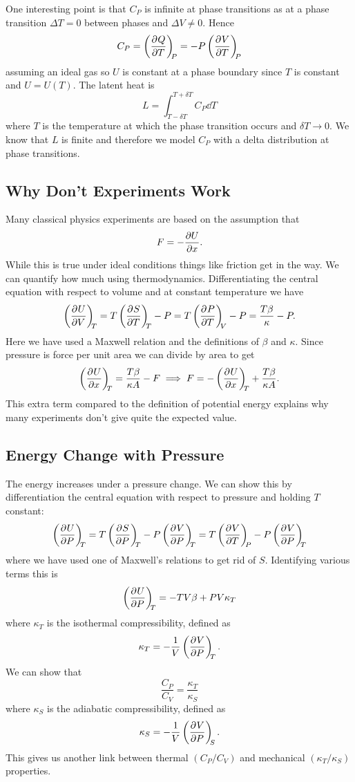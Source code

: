     One interesting point is that \(C_P\) is infinite at phase transitions as at a phase transition \(\Delta T = 0\) between phases and \(\Delta V \ne 0\).
    Hence
    \[C_P = \left(\pdv[]{Q}{T}\right)_{\!\!{P}} = -P\left(\pdv[]{V}{T}\right)_{\!\!{P}}\]
    assuming an ideal gas so \(U\) is constant at a phase boundary since \(T\) is constant and \(U = U(T)\).
    The latent heat is
    \[L = \int_{T - \delta T}^{T + \delta T}C_P\dd{T}\]
    where \(T\) is the temperature at which the phase transition occurs and \(\delta T \to 0\).
    We know that \(L\) is finite and therefore we model \(C_P\) with a delta distribution at phase transitions.
    
    \subsection{Why Don't Experiments Work}
    Many classical physics experiments are based on the assumption that
    \[F = -\pdv{U}{x}.\]
    While this is true under ideal conditions things like friction get in the way.
    We can quantify how much using thermodynamics.
    Differentiating the central equation with respect to volume and at constant temperature we have
    \[\left(\pdv[]{U}{V}\right)_{\!\!{T}} = T\left(\pdv[]{S}{T}\right)_{\!\!{T}} - P = T\left(\pdv[]{P}{T}\right)_{\!\!{V}} - P = \frac{T\beta}{\kappa} - P.\]
    Here we have used a Maxwell relation and the definitions of \(\beta\) and \(\kappa\).
    Since pressure is force per unit area we can divide by area to get
    \[\left(\pdv[]{U}{x}\right)_{\!\!{T}} = \frac{T\beta}{\kappa A} -F \implies F = -\left(\pdv[]{U}{x}\right)_{\!\!{T}} + \frac{T\beta}{\kappa A}.\]
    This extra term compared to the definition of potential energy explains why many experiments don't give quite the expected value.
    
    \subsection{Energy Change with Pressure}
    The energy increases under a pressure change.
    We can show this by differentiation the central equation with respect to pressure and holding \(T\) constant:
    \[\pdvconst{U}{P}{T} = T\pdvconst{S}{P}{T} - P\pdvconst{V}{P}{T} = T\pdvconst{V}{T}{P} - P\pdvconst{V}{P}{T}\]
    where we have used one of Maxwell's relations to get rid of \(S\).
    Identifying various terms this is
    \[\left(\pdv[]{U}{P}\right)_{\!\!{T}} = -TV\beta + PV\kappa_T\]
    where \(\kappa_T\) is the isothermal compressibility, defined as
    \[\kappa_T = -\frac{1}{V}\left(\pdv[]{V}{P}\right)_{\!\!{T}}.\]
    We can show that
    \[\frac{C_P}{C_V} = \frac{\kappa_T}{\kappa_S}\]
    where \(\kappa_S\) is the adiabatic compressibility, defined as
    \[\kappa_S = -\frac{1}{V}\left(\pdv[]{V}{P}\right)_{\!\!{S}}.\]
    This gives us another link between thermal \((C_P/C_V)\) and mechanical \((\kappa_T/\kappa_S)\) properties.
    
